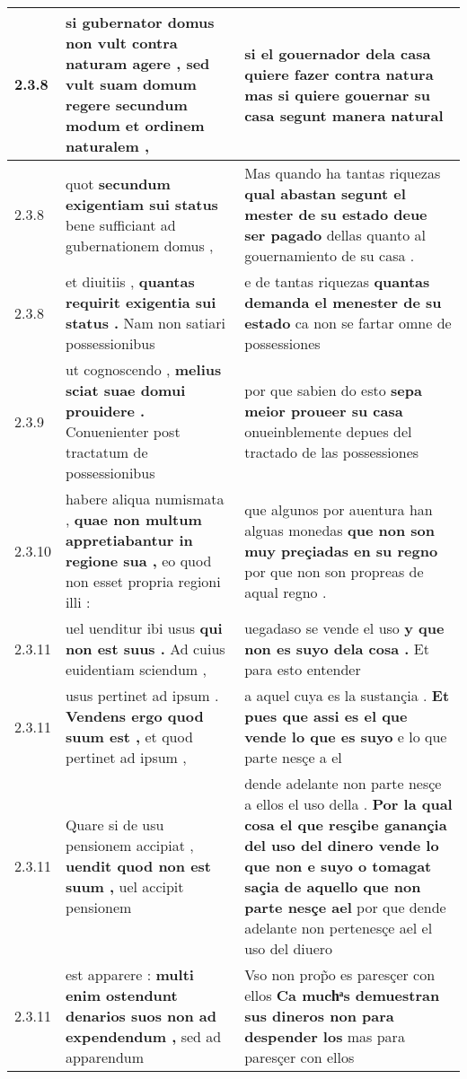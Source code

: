 \begin{tabular}{|p{1cm}|p{6.5cm}|p{6.5cm}|}
2.3.8 & si gubernator domus non vult contra naturam agere , \textbf{ sed vult suam domum regere } secundum modum et ordinem naturalem , & si el gouernador dela casa quiere fazer contra natura \textbf{ mas si quiere gouernar su casa } segunt manera natural \\\hline
2.3.8 & quot \textbf{ secundum exigentiam sui status } bene sufficiant ad gubernationem domus , & Mas quando ha tantas riquezas \textbf{ qual abastan segunt el mester de su estado deue ser pagado } dellas quanto al gouernamiento de su casa . \\\hline
2.3.8 & et diuitiis , \textbf{ quantas requirit exigentia sui status . } Nam non satiari possessionibus & e de tantas riquezas \textbf{ quantas demanda el menester de su estado } ca non se fartar omne de possessiones \\\hline
2.3.9 & ut cognoscendo , \textbf{ melius sciat suae domui prouidere . } Conuenienter post tractatum de possessionibus & por que sabien do esto \textbf{ sepa meior proueer su casa } onueinblemente depues del tractado de las possessiones \\\hline
2.3.10 & habere aliqua numismata , \textbf{ quae non multum appretiabantur in regione sua , } eo quod non esset propria regioni illi : & que algunos por auentura han alguas monedas \textbf{ que non son muy preçiadas en su regno } por que non son propreas de aqual regno . \\\hline
2.3.11 & uel uenditur ibi usus \textbf{ qui non est suus . } Ad cuius euidentiam sciendum , & uegadaso se vende el uso \textbf{ y que non es suyo dela cosa . } Et para esto entender \\\hline
2.3.11 & usus pertinet ad ipsum . \textbf{ Vendens ergo quod suum est , } et quod pertinet ad ipsum , & a aquel cuya es la sustançia . \textbf{ Et pues que assi es el que vende lo que es suyo } e lo que parte nesçe a el \\\hline
2.3.11 & Quare si de usu pensionem accipiat , \textbf{ uendit quod non est suum , } uel accipit pensionem & dende adelante non parte nesçe a ellos el uso della . \textbf{ Por la qual cosa el que resçibe ganançia del uso del dinero vende lo que non e suyo o tomagat saçia de aquello que non parte nesçe ael } por que dende adelante non pertenesçe ael el uso del diuero \\\hline
2.3.11 & est apparere : \textbf{ multi enim ostendunt denarios suos non ad expendendum , } sed ad apparendum & Vso non prop̃o es paresçer con ellos \textbf{ Ca muchͣs demuestran sus dineros non para despender los } mas para paresçer con ellos \\\hline

\end{tabular}
